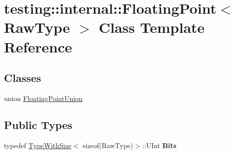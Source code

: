\hypertarget{classtesting_1_1internal_1_1_floating_point}{}\section{testing\+:\+:internal\+:\+:Floating\+Point$<$ Raw\+Type $>$ Class Template Reference}
\label{classtesting_1_1internal_1_1_floating_point}
\subsection*{Classes}
\begin{DoxyCompactItemize}
\item 
union \mbox{\hyperlink{uniontesting_1_1internal_1_1_floating_point_1_1_floating_point_union}{Floating\+Point\+Union}}
\end{DoxyCompactItemize}
\subsection*{Public Types}
\begin{DoxyCompactItemize}
\item 
\mbox{\label{classtesting_1_1internal_1_1_floating_point_abf228bf6cd48f12c8b44c85b4971a731}} 
typedef \mbox{\hyperlink{classtesting_1_1internal_1_1_type_with_size}{Type\+With\+Size}}$<$ sizeof(Raw\+Type)$>$\+::U\+Int {\bfseries Bits}
\end{DoxyCompactItemize}
